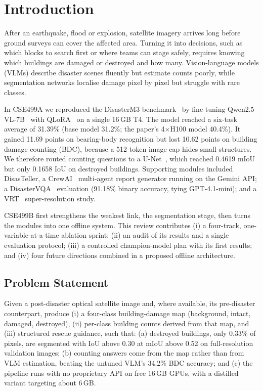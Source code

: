 \documentclass[conference]{IEEEtran}
\begin{document}
\section{Introduction}
After an earthquake, flood or explosion, satellite imagery arrives long before ground surveys can cover the affected area. Turning it into decisions, such as which blocks to search first or where teams can stage safely, requires knowing which buildings are damaged or destroyed and how many. Vision-language models (VLMs) describe disaster scenes fluently but estimate counts poorly, while segmentation networks localise damage pixel by pixel but struggle with rare classes.

In CSE499A we reproduced the DisasterM3 benchmark~\cite{disasterm3} by fine-tuning Qwen2.5-VL-7B~\cite{qwen25vl} with QLoRA~\cite{qlora} on a single 16\,GB T4. The model reached a six-task average of 31.39\% (base model 31.2\%; the paper's 4$\times$H100 model 40.4\%). It gained 11.69 points on bearing-body recognition but lost 10.62 points on building damage counting (BDC), because a 512-token image cap hides small structures. We therefore routed counting questions to a U-Net~\cite{unet}, which reached 0.4619 mIoU but only 0.1658 IoU on destroyed buildings. Supporting modules included DisasTeller, a CrewAI~\cite{crewai} multi-agent report generator running on the Gemini API; a DisasterVQA~\cite{disastervqa} evaluation (91.18\% binary accuracy, tying GPT-4.1-mini); and a VRT~\cite{vrt} super-resolution study.

CSE499B first strengthens the weakest link, the segmentation stage, then turns the modules into one offline system. This review contributes (i) a four-track, one-variable-at-a-time ablation sprint; (ii) an audit of its results and a single evaluation protocol; (iii) a controlled champion-model plan with its first results; and (iv) four future directions combined in a proposed offline architecture.

\subsection{Problem Statement}
Given a post-disaster optical satellite image and, where available, its pre-disaster counterpart, produce (i) a four-class building-damage map (background, intact, damaged, destroyed), (ii) per-class building counts derived from that map, and (iii) structured rescue guidance, such that: (a) destroyed buildings, only 0.33\% of pixels, are segmented with IoU above 0.30 at mIoU above 0.52 on full-resolution validation images; (b) counting answers come from the map rather than from VLM estimation, beating the untuned VLM's 34.2\% BDC accuracy; and (c) the pipeline runs with no proprietary API on free 16\,GB GPUs, with a distilled variant targeting about 6\,GB.
\end{document}
